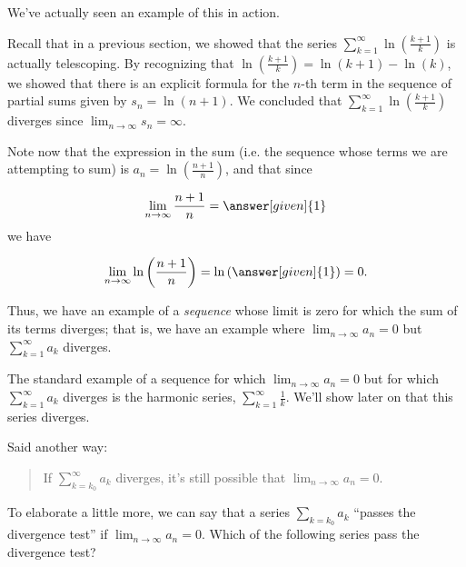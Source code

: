\documentclass{ximera}
\begin{document}
We've actually seen an example of this in action.  

\begin{example}
Recall that in a previous section, we showed that the series $\sum_{k=1}^\infty \ln\left(\frac{k+1}{k}\right)$ is actually telescoping.  By recognizing that $\ln\left(\frac{k+1}{k}\right) = \ln(k+1)-\ln(k)$, we showed that there is an explicit formula for the $n$-th term in the sequence of partial sums given by $s_n = \ln(n+1)$.  We concluded that $\sum_{k=1}^\infty \ln\left(\frac{k+1}{k}\right)$ diverges since $\lim_{n \to \infty} s_n = \infty$.   

Note now that the expression in the sum (i.e. the sequence whose terms we are attempting to sum) is $a_n =   \ln\left(\frac{n+1}{n}\right)$, and that since

\[
\lim_{n \to \infty} \frac{n+1}{n} = \answer[given]{1}
\]
we have

\[
\lim_{n \to \infty} \ln\left(\frac{n+1}{n}\right) = \ln\left(\answer[given]{1}\right) = 0.
\]

Thus, we have an example of a \emph{sequence} whose limit is zero for which the sum of its terms diverges; that is, we have an example where $\lim_{n \to \infty} a_n =0$ but $\sum_{k=1}^{\infty} a_k$ diverges.
\end{example}


\begin{remark}
The standard example of a sequence for which $\lim_{n \to \infty} a_n =0$ but for which $\sum_{k=1}^{\infty} a_k$ diverges is the harmonic series, $\sum_{k=1}^{\infty} \frac{1}{k}$.  We'll show later on that this series diverges.
\end{remark}

Said another way: 
\begin{quote}
If $\sum_{k=k_0}^{\infty} a_k$ diverges, it's still possible that  $\lim_{n \to \infty} a_n =0$. 
\end{quote}
  
\begin{question}
To elaborate a little more, we can say that a series $\sum_{k=k_0} a_k$ ``passes the divergence test'' if $\lim_{n \to \infty} a_n=0$.  Which of the following series pass the divergence test?
\begin{selectAll}
\end{selectAll}
\end{question}
\end{document}
